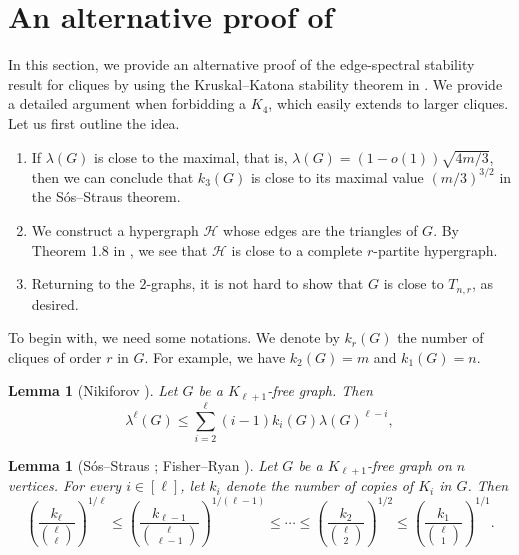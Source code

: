 \documentclass[11pt,a4paper]{article}
\newtheorem{lemma}[theorem]{Lemma}
\theoremstyle{definition}
\theoremstyle{remark}
\begin{document}
%
%



\appendix



\section{An alternative proof of } 

\label{sec-A}


In this section, we provide an alternative proof of the edge-spectral stability result for cliques by using the Kruskal--Katona stability theorem in \cite{LM2023}. We provide a detailed argument when forbidding a $K_4$, which easily extends to larger cliques. Let us first outline the idea.

\begin{enumerate}
    \item If $\lambda(G)$ is close to the maximal, that is, 
    $\lambda (G)= (1-o(1))\sqrt{4m/3}$, then we can conclude that $k_3(G)$ is close to its maximal value $(m/3)^{3/2}$ in the S\'{o}s--Straus theorem.
    \item We construct a hypergraph $\mathcal{H}$ whose edges are the triangles of $G$. By Theorem 1.8 in \cite{LM2023}, 
    we see that $\mathcal{H}$ is close to a complete $r$-partite hypergraph.
    \item Returning to the $2$-graphs, 
    it is not hard to show that $G$ is close to $T_{n, r}$, as desired. 
\end{enumerate}

To begin with, we need some notations. 
We denote by $k_r(G)$ the number of cliques of order $r$ in $G$.  
For example, we have $k_2(G)=m$ and $k_1(G)=n$. 

\begin{lemma}[Nikiforov \cite{Niki2002}] \label{thm-Niki-2002-p}
Let $G$ be a $K_{\ell+1}$-free graph. Then 
\begin{equation} \label{eq-Niki-2002-clique}
 \lambda^{\ell} (G) \le 
\sum_{i=2}^{\ell} (i-1)k_i(G) \lambda (G)^{\ell -i},
\end{equation}
\end{lemma}

\begin{lemma}[S\'{o}s--Straus \cite{SS1982}; 
Fisher--Ryan \cite{FR1992}]   
\label{lem-SS-FR}
Let $G$ be a $K_{\ell+1}$-free graph on $n$ vertices. 
For every $i\in [\ell]$, let $k_i$ denote the number of copies of $K_i$ 
in $G$. Then 
\begin{equation} \label{eq-SS-FR}
  \left( \frac{k_{\ell}}{{\ell \choose \ell}}\right)^{1/\ell} 
\le  \left( \frac{k_{\ell-1}}{{\ell \choose \ell-1}}\right)^{1/(\ell-1)} 
\le \cdots \le \left( \frac{k_2}{{\ell \choose 2}}\right)^{1/2} 
\le \left( \frac{k_1}{{\ell \choose 1}}\right)^{1/1}. 
\end{equation} 
\end{lemma}
\end{document}
